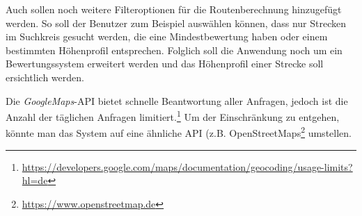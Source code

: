 \documentclass[a4paper,11pt,utf8]{scrartcl}
\begin{document}
Auch sollen noch weitere Filteroptionen für die Routenberechnung hinzugefügt werden. So soll der Benutzer zum Beispiel auswählen können, dass nur Strecken im Suchkreis gesucht werden, die eine Mindestbewertung haben oder einem bestimmten Höhenprofil entsprechen. Folglich soll die Anwendung noch um ein Bewertungssystem erweitert werden und das Höhenprofil einer Strecke soll ersichtlich werden.

Die \textit{GoogleMaps}-API bietet schnelle Beantwortung aller Anfragen, jedoch ist die Anzahl der täglichen Anfragen limitiert.\footnote{\url{https://developers.google.com/maps/documentation/geocoding/usage-limits?hl=de}} Um der Einschränkung zu entgehen, könnte man das System auf eine ähnliche API (z.B. OpenStreetMaps\footnote{\url{https://www.openstreetmap.de}} umstellen.
\end{document}
